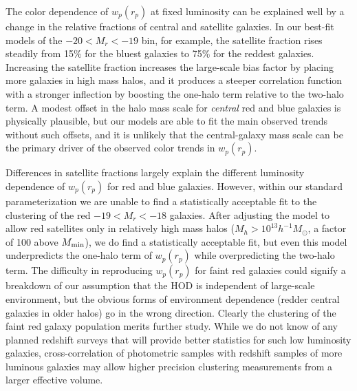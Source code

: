 \documentclass[]{emulateapj}
\newcommand{\wrp}{{w_p(r_p)}}
\def\hMsun{h^{-1}M_\odot}
\begin{document}
The color dependence of $\wrp$ at fixed luminosity can be 
explained well by a change in the relative fractions of central and
satellite galaxies.  In our best-fit models of the $-20<M_r<-19$
bin, for example, the satellite fraction rises steadily from
15\% for the bluest galaxies to 75\% for the reddest galaxies.
Increasing the 
satellite fraction increases the large-scale bias
factor by placing more galaxies in high mass halos, and it produces
a steeper correlation function with a stronger inflection by
boosting the one-halo term relative to the two-halo term.  A modest
offset in the halo mass scale for {\it central} red and blue
galaxies is physically plausible, but our models are able to
fit the main observed trends without such offsets, and it is
unlikely that the central-galaxy mass scale can be the primary
driver of the observed color trends in $\wrp$.

Differences in satellite fractions largely explain the different
luminosity dependence of $\wrp$ for red and blue galaxies.
However, within our standard parameterization we are unable
to find a statistically acceptable fit to the clustering
of the red $-19 < M_r < -18$ galaxies.  After adjusting the model
to allow red satellites only in relatively high mass halos
($M_h > 10^{13} \hMsun$, a factor of 100 above $M_{\rm min}$),
we do find a statistically acceptable fit, but even this
model underpredicts the one-halo term of $\wrp$ while overpredicting
the two-halo term.  The difficulty in reproducing $\wrp$ for
faint red galaxies could signify a breakdown of our assumption
that the HOD is independent of large-scale environment, but the
obvious forms of environment dependence (redder central galaxies
in older halos) go in the wrong direction.
Clearly the clustering of the faint red galaxy population merits
further study.  While we do not know of any planned redshift
surveys that will provide better statistics for such low luminosity
galaxies, cross-correlation of photometric samples with redshift
samples of more luminous galaxies may allow higher precision
clustering measurements from a larger effective volume.
\end{document}
